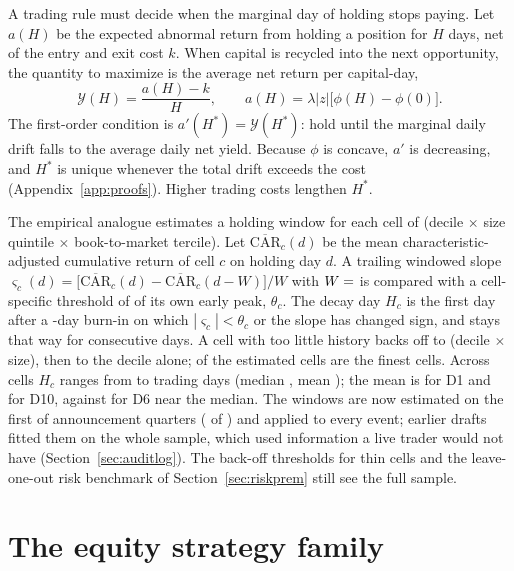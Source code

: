 \documentclass[11pt]{article}
\theoremstyle{definition}
\newcommand{\1}{\mathbf{1}}
\begin{document}
A trading rule must decide when the marginal day of holding stops paying. Let $a(H)$ be the expected
abnormal return from holding a position for $H$ days, net of the entry and exit cost $k$. When capital is
recycled into the next opportunity, the quantity to maximize is the average net return per capital-day,
\begin{equation}
  \mathcal Y(H)=\frac{a(H)-k}{H},\qquad a(H)=\lambda|z|\big[\phi(H)-\phi(0)\big].
  \label{eq:holding}
\end{equation}
The first-order condition is $a'(H^\ast)=\mathcal Y(H^\ast)$: hold until the marginal daily drift falls to
the average daily net yield. Because $\phi$ is concave, $a'$ is decreasing, and $H^\ast$ is unique whenever
the total drift exceeds the cost (Appendix~\ref{app:proofs}). Higher trading costs lengthen $H^\ast$.

The empirical analogue estimates a holding window for each cell of (decile $\times$ size quintile
$\times$ book-to-market tercile). Let $\overline{\mathrm{CAR}}_c(d)$ be the mean characteristic-adjusted
cumulative return of cell $c$ on holding day $d$. A trailing windowed slope
$\varsigma_c(d)=\big[\overline{\mathrm{CAR}}_c(d)-\overline{\mathrm{CAR}}_c(d-W)\big]/W$ with
$W=\stv{decay.window}$ is compared with a cell-specific threshold of  of its own early
peak, $\theta_c$. The decay day $H_c$ is the first day after a -day burn-in on which
$|\varsigma_c|<\theta_c$ or the slope has changed sign, and stays that way for  consecutive days.
A cell with too little history backs off to (decile $\times$ size), then to the decile alone;
 of the  estimated cells are the finest cells. Across cells $H_c$ ranges from
 to  trading days (median , mean ); the mean is
 for D1 and  for D10, against  for D6 near the median.
The windows are now estimated on the first  of announcement quarters ( of ) and applied to every event; earlier drafts fitted them on the whole sample,
which used information a live trader would not have (Section~\ref{sec:auditlog}). The back-off thresholds for thin cells and the leave-one-out risk benchmark of Section~\ref{sec:riskprem} still see the full sample.

\section{The equity strategy family}\label{sec:equity}
\end{document}
